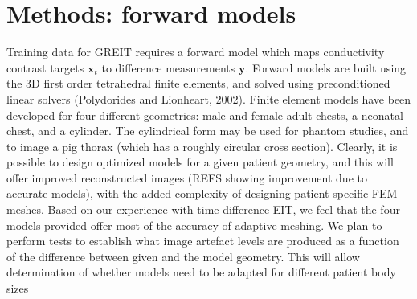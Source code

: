 \documentclass[12pt]{iopart}
\newcommand{\xB}{\mbox{$\mathbf{x}$}}
\newcommand{\yB}{\mbox{$\mathbf{y}$}}
\begin{document}
\section{Methods: forward models}

Training data for GREIT requires a forward model which
maps conductivity contrast targets $\xB_t$ to difference
measurements $\yB$. Forward models are built using
the 3D first order tetrahedral finite elements, and
solved using preconditioned linear solvers
(Polydorides and Lionheart, 2002).
Finite element models have been developed for four
different geometries: 
male and female adult chests,
a neonatal chest, and
a cylinder. The cylindrical form may be used
for phantom studies, and to image a pig thorax
(which has a roughly circular cross section).
Clearly, it is possible to design optimized
models for a given patient geometry, and this
will offer improved reconstructed images (REFS
showing improvement due to accurate models),
with the added complexity of designing
patient specific FEM meshes.
Based on our experience with time-difference
EIT, we feel that the four models provided offer
most of the accuracy of adaptive meshing.
We plan to perform tests to establish what 
image artefact levels are produced as a function
of the difference between given and the model
geometry. This will allow determination of whether
models need to be adapted 
for different patient body sizes
\end{document}

